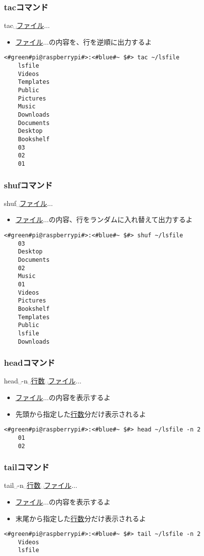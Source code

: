 \begin{frame}[fragile]
    \frametitle{tacコマンド}
    tac␣\underline{ファイル}$\ldots$
    \begin{itemize}
        \item \underline{ファイル}$\ldots$の内容を、行を逆順に出力するよ
    \end{itemize}
    \begin{lstlisting}[title=tacコマンドの実行例, label=tac_example]
    <#green#pi@raspberrypi#>:<#blue#~ $#> tac ~/lsfile
    lsfile
    Videos
    Templates
    Public
    Pictures
    Music
    Downloads
    Documents
    Desktop
    Bookshelf
    03
    02
    01 
    \end{lstlisting}
\end{frame}

\begin{frame}[fragile]
    \frametitle{shufコマンド}
    shuf␣\underline{ファイル}$\ldots$
    \begin{itemize}
        \item \underline{ファイル}$\ldots$の内容、行をランダムに入れ替えて出力するよ
    \end{itemize}
    \begin{lstlisting}[title=shufコマンドの実行例, label=shuf_example]
    <#green#pi@raspberrypi#>:<#blue#~ $#> shuf ~/lsfile
    03
    Desktop
    Documents
    02
    Music
    01
    Videos
    Pictures
    Bookshelf
    Templates
    Public
    lsfile
    Downloads
    \end{lstlisting}
\end{frame}

\begin{frame}[fragile]
    \frametitle{headコマンド}
    head␣-n␣\underline{行数}␣\underline{ファイル}$\ldots$
    \begin{itemize}
        \item \underline{ファイル}$\ldots$の内容を表示するよ
        \item 先頭から指定した\underline{行数}分だけ表示されるよ
    \end{itemize}
    \begin{lstlisting}[title=headコマンドの実行例, label=shuf_example]
    <#green#pi@raspberrypi#>:<#blue#~ $#> head ~/lsfile -n 2
    01
    02
    \end{lstlisting}
\end{frame}

\begin{frame}[fragile]
    \frametitle{tailコマンド}
    tail␣-n␣\underline{行数}␣\underline{ファイル}$\ldots$
    \begin{itemize}
        \item \underline{ファイル}$\ldots$の内容を表示するよ
        \item 末尾から指定した\underline{行数}分だけ表示されるよ
    \end{itemize}
    \begin{lstlisting}[title=tailコマンドの実行例, label=shuf_example]
    <#green#pi@raspberrypi#>:<#blue#~ $#> tail ~/lsfile -n 2
    Videos
    lsfile
    \end{lstlisting}
\end{frame}

